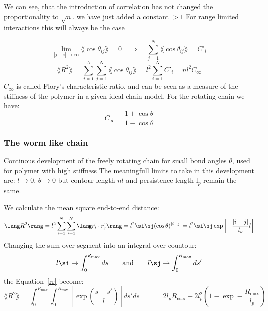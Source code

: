 We can see, that the introduction of correlation has not changed the proportionality to $\sqrt{n}$. we have just added a constant $>1$
For range limited interactions this will always be the case 

\begin{equation}
\lim_{|j-i|\rightarrow \infty} \lang \cos\theta_{ij}\rang =0 \quad \Rightarrow \quad \sum_{j=1}^N \lang \cos\theta_{ij} \rang = C'_i
\end{equation}
\begin{equation}
\lang R^2 \rang = \sum_{i=1}^N \sum_{j=1}^N \lang \cos\theta_{ij}\rang = l^2 \sum_{i=1}^N C'_i = nl^2 C_\infty
\end{equation}
$C_\infty$ is called Flory's characteristic ratio, and can be seen as a measure of the stiffness of the polymer in a given ideal chain model.
For the rotating chain we have:
\begin{equation}
C_\infty = \frac{1+\cos\theta}{1-\cos\theta}
\end{equation}

\subsubsection{The worm like chain}
Continous development of the freely rotating chain for small bond angles $\theta$, used for polymer with high stiffness 
The meaningfull limits to take in this development are: $l\rightarrow0$,  $\theta \rightarrow 0$  but contour length $nl$ and persistence length l$_p$ remain the same.

We calculate the mean square end-to-end distance: 
\begin{equation}
\lang R^2 \rang = l^2 \sum_{i=1}^N \sum_{j=1}^N \lang \vec{r}_i \cdot \vec{r}_j \rang = l^2 \si \sj (\cos\theta)^{|i-j|} = l^2 \si \sj \exp \left[ -\frac{|i-j|}{l_p}l \right]
\label{rr}
\end{equation}
Changing the sum over segment into an integral over countour: 
\begin{equation}
l \si \rightarrow \int_0^{R_{\text{max}}} ds \qquad \text{and} \qquad l \sj \rightarrow \int_0^{R_{\text{max}}} ds'
\end{equation}
the Equation~\ref{rr} become:
\begin{equation}
\lang R^2 \rang = \int_0^{R_{\text{max}}}  \int_0^{R_{\text{max}}} \left[ \exp\left( \frac{s-s'}{l} \right) \right] ds'ds \quad = \quad 2l_p R_{\text{max}} - 2l_p^2 \left(1-\exp-\frac{R_{\text{max}}}{l_p} \right)
\end{equation}
